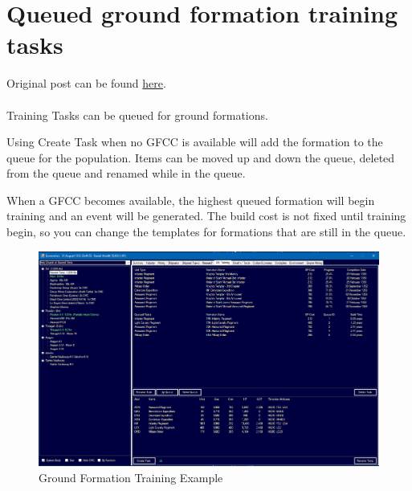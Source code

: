 \documentclass[../../Aurora C# unofficial manual.tex]{subfiles}
\begin{document}
	\section{Queued ground formation training tasks}
	Original post can be found
	\href{http://aurora2.pentarch.org/index.php?topic=11306.msg131309#msg131309}{here}.
	\\\\
	
	Training Tasks can be queued for ground formations.
	
	Using Create Task when no GFCC is available will add the formation to the queue for the population. Items can be moved up and down the queue, deleted from the queue and renamed while in the queue.
	
	When a GFCC becomes available, the highest queued formation will begin training and an event will be generated. The build cost is not fixed until training begin, so you can change the templates for formations that are still in the queue.
	\begin{figure}[H]
		\centering
		\includegraphics[width=0.95\linewidth]{images/GroundFormationTraining}
		\caption[Ground Formation Training]{Ground Formation Training Example}
		\label{fig:groundformationtraining}
	\end{figure}
\end{document}
